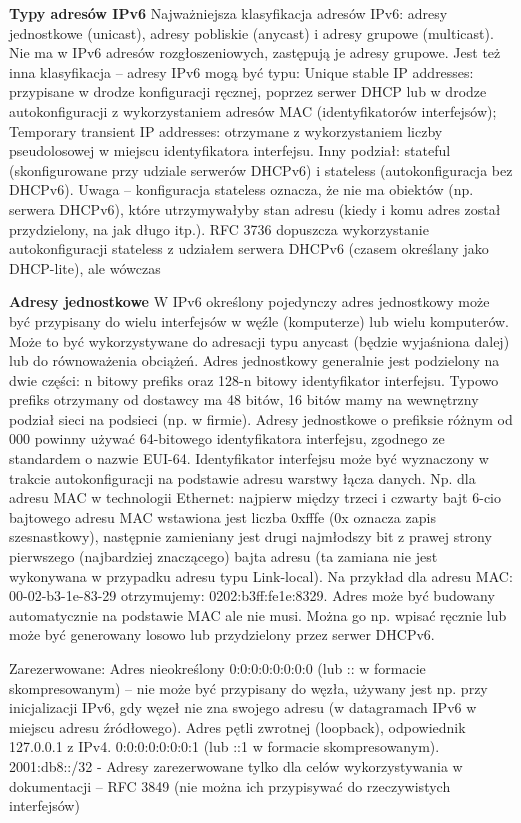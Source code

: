     \textbf{Typy adresów IPv6}
    Najważniejsza klasyfikacja adresów IPv6:
    adresy jednostkowe (unicast), adresy pobliskie (anycast) i adresy grupowe (multicast). Nie
    ma w IPv6 adresów rozgłoszeniowych, zastępują je adresy grupowe.
    Jest też inna klasyfikacja – adresy IPv6 mogą być typu:
    Unique stable IP addresses: przypisane w drodze konfiguracji ręcznej, poprzez serwer DHCP
    lub w drodze autokonfiguracji z wykorzystaniem adresów MAC (identyfikatorów
    interfejsów);
    Temporary transient IP addresses: otrzymane z wykorzystaniem liczby pseudolosowej w
    miejscu identyfikatora interfejsu.
    Inny podział: stateful (skonfigurowane przy udziale serwerów DHCPv6) i stateless
    (autokonfiguracja bez DHCPv6). Uwaga – konfiguracja stateless oznacza, że nie ma obiektów
    (np. serwera DHCPv6), które utrzymywałyby stan adresu (kiedy i komu adres został
    przydzielony, na jak długo itp.). RFC 3736 dopuszcza wykorzystanie autokonfiguracji stateless
    z udziałem serwera DHCPv6 (czasem określany jako DHCP-lite), ale wówczas

    \textbf{Adresy jednostkowe}
    W IPv6 określony pojedynczy adres jednostkowy może być przypisany do wielu interfejsów w
    węźle (komputerze) lub wielu komputerów. Może to być wykorzystywane do adresacji typu
    anycast (będzie wyjaśniona dalej) lub do równoważenia obciążeń.
    Adres jednostkowy generalnie jest podzielony na dwie części: n bitowy prefiks oraz 128-n
    bitowy identyfikator interfejsu. Typowo prefiks otrzymany od dostawcy ma 48 bitów, 16
    bitów mamy na wewnętrzny podział sieci na podsieci (np. w firmie).
    Adresy jednostkowe o prefiksie różnym od 000 powinny używać 64-bitowego identyfikatora
    interfejsu, zgodnego ze standardem o nazwie EUI-64.
    Identyfikator interfejsu może być wyznaczony w trakcie autokonfiguracji na podstawie
    adresu warstwy łącza danych. Np. dla adresu MAC w technologii Ethernet: najpierw między
    trzeci i czwarty bajt 6-cio bajtowego adresu MAC wstawiona jest liczba 0xfffe (0x oznacza
    zapis szesnastkowy), następnie zamieniany jest drugi najmłodszy bit z prawej strony
    pierwszego (najbardziej znaczącego) bajta adresu (ta zamiana nie jest wykonywana w
    przypadku adresu typu Link-local).
    Na przykład dla adresu MAC: 00-02-b3-1e-83-29 otrzymujemy:
    0202:b3ff:fe1e:8329.
    Adres może być budowany automatycznie na podstawie MAC ale nie musi. Można go np.
    wpisać ręcznie lub może być generowany losowo lub przydzielony przez serwer DHCPv6.

    Zarezerwowane:
    Adres nieokreślony
    0:0:0:0:0:0:0:0 (lub :: w formacie skompresowanym) – nie może być przypisany do węzła,
    używany jest np. przy inicjalizacji IPv6, gdy węzeł nie zna swojego adresu (w datagramach
    IPv6 w miejscu adresu źródłowego).
    Adres pętli zwrotnej (loopback), odpowiednik 127.0.0.1 z IPv4.
    0:0:0:0:0:0:0:1 (lub ::1 w formacie skompresowanym).
    2001:db8::/32 - Adresy zarezerwowane tylko dla celów wykorzystywania w dokumentacji –
    RFC 3849 (nie można ich przypisywać do rzeczywistych interfejsów)


